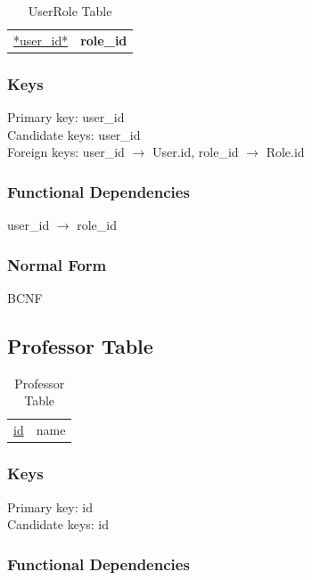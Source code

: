 \documentclass[11pt]{article}
\begin{document}
\begin{table}[htb]
\caption{UserRole Table} 
\begin{center}
\begin{tabular}{l|l}
 \underline{*user\_id*}  &  \textbf{role\_id}  \\
\end{tabular}
\end{center}
\end{table}
\subsubsection{Keys}
\label{sec-3-3-1}

    
    Primary key: user\_id\\
    Candidate keys: user\_id\\
    Foreign keys: user\_id $\rightarrow$ User.id, role\_id $\rightarrow$ Role.id
\subsubsection{Functional Dependencies}
\label{sec-3-3-2}


    user\_id $\rightarrow$ role\_id
    
\subsubsection{Normal Form}
\label{sec-3-3-3}


    BCNF
\subsection{Professor Table}
\label{sec-3-4}


\begin{table}[htb]
\caption{Professor Table} 
\begin{center}
\begin{tabular}{l|l}
 \underline{id}  &  name  \\
\end{tabular}
\end{center}
\end{table}
\subsubsection{Keys}
\label{sec-3-4-1}

    
    Primary key: id\\
    Candidate keys: id
\subsubsection{Functional Dependencies}
\label{sec-3-4-2}
\end{document}
